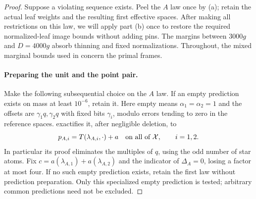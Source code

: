 \begin{proof}
Suppose a violating sequence exists.  Peel the \(A\) law once
by \textup{(a)}; retain the actual leaf weights
and the resulting first effective spaces.  After making all
restrictions on this law, we will apply part \textup{(b)} once
to restore the required normalized-leaf image bounds without
adding pins.  The margins between \(3000g\) and
\(D=4000g\) absorb thinning and fixed normalizations.
Throughout, the mixed marginal bounds used in
 concern the primal frames.

\paragraph{Preparing the unit and the point pair.}
Make the following subsequential choice on the \(A\) law.
If an empty prediction exists on mass at least \(10^{-6}\),
retain it.  Here empty means \(\alpha_1=\alpha_2=1\) and
the offsets are \(\gamma_1q,\gamma_2q\) with fixed bits
\(\gamma_i\), modulo errors tending to zero in the reference
spaces.   exactifies it, after negligible
deletion, to
\begin{equation}
\label{eq:asym-exact-A}
 p_{A,i}=T(\lambda_{A,i},\cdot)+a
                  \quad\hbox{on all of }\mathcal X,\qquad i=1,2.
\end{equation}
In particular its proof eliminates the multiples of \(q\),
using the odd number of star atoms.  Fix
\(c=a(\lambda_{A,1})+a(\lambda_{A,2})\) and the indicator
of \(\Delta_A=0\), losing a factor at most four.  If no
such empty prediction exists, retain the first law without
prediction preparation.  Only this specialized empty prediction
is tested; arbitrary common predictions need not be excluded.


\end{proof}
